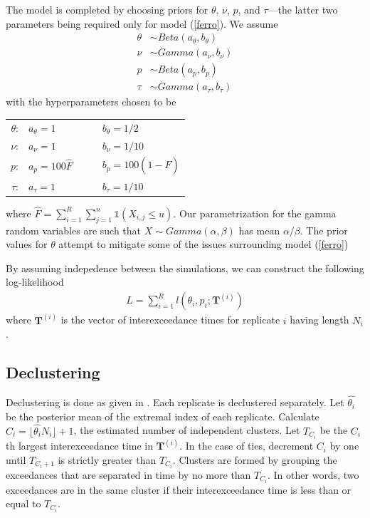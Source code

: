 \documentclass[12pt]{article}
\newcommand{\m}[1]{\mathbf{\bm{#1}}}
\newcommand{\ind}{\mathds{1}}
\begin{document}
The model is completed by choosing priors for $\theta$, $\nu$, $p$, and $\tau$---the latter two parameters being required only for model (\ref{ferro}). We assume
\begin{align*}
\theta &\sim Beta(a_\theta, b_\theta) \\
\nu &\sim Gamma(a_\nu, b_\nu) \\
p &\sim Beta(a_p, b_p) \\
\tau &\sim Gamma(a_\tau, b_\tau) 
\end{align*}
with the hyperparameters chosen to be
\begin{center}
\begin{tabular}{rlcl}
$\theta$: & $a_\theta = 1          $ &~~& $b_\theta = 1/2             $ \\
$   \nu$: & $   a_\nu = 1          $ &~~& $   b_\nu = 1/10            $ \\
$     p$: & $     a_p = 100 \hat{F}$ &~~& $     b_p = 100 (1-\hat{F}) $ \\
$  \tau$: & $  a_\tau = 1          $ &~~& $  b_\tau = 1/10            $ \\
\end{tabular}
\end{center}
where $\hat{F}=\sum_{i=1}^R\sum_{j=1}^n \ind(X_{i,j}\leq u)$. Our parametrization for the gamma random variables are such that $X\sim Gamma(\alpha,\beta)$ has mean $\alpha/\beta$. The prior values for $\theta$ attempt to mitigate some of the issues surrounding model (\ref{ferro})

By assuming indepedence between the simulations, we can construct the following log-likelihood
\begin{align}
L = \sum_{i=1}^R l(\theta_i, p_i; \m{T}^{(i)}) \label{hiertheta}
\end{align}
where $\m{T}^{(i)}$ is the vector of interexceedance times for replicate $i$ having length $N_i$.

\subsection{Declustering}

Declustering is done as given in \cite{ferro2003inference}. Each replicate is declustered separately. Let $\hat{\theta_i}$ be the posterior mean of the extremal index of each replicate. Calculate $C_i=\lfloor \hat{\theta_i} N_i \rfloor + 1$, the estimated number of independent clusters. Let $T_{C_i}$ be the $C_i$th largest interexceedance time in $\m{T}^{(i)}$. In the case of ties, decrement $C_i$ by one until $T_{C_i+1}$ is strictly greater than $T_{C_i}$. Clusters are formed by grouping the exceedances that are separated in time by no more than $T_{C_i}$. In other words, two exceedances are in the same cluster if their interexceedance time is less than or equal to $T_{C_i}$.
\end{document}
